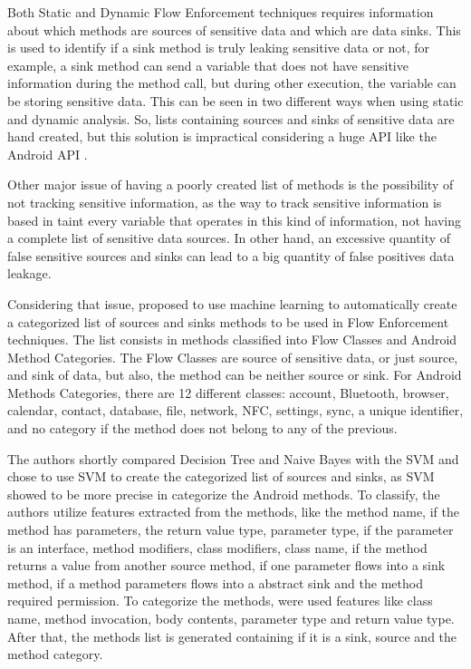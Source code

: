 Both Static and Dynamic Flow Enforcement techniques requires information about which methods are sources of sensitive data and which are data sinks. This is used to identify if a sink method is truly leaking sensitive data or not, for example, a sink method can send a variable that does not have sensitive information during the method call, but during other execution, the variable can be storing sensitive data. This can be seen in two different ways when using static and dynamic analysis. So, lists containing sources and sinks of sensitive data are hand created, but this solution is impractical considering a huge API like the Android API \citep{rasthofer2014machine}.

Other major issue of having a poorly created list of methods is the possibility of not tracking sensitive information, as the way to track sensitive information is based in taint every variable that operates in this kind of information, not having a complete list of sensitive data sources. In other hand, an excessive quantity of false sensitive sources and sinks can lead to a big quantity of false positives data leakage. 

Considering that issue, \cite{rasthofer2014machine} proposed to use machine learning to automatically create a categorized list of sources and sinks methods to be used in Flow Enforcement techniques. The list consists in methods classified into Flow Classes and Android Method Categories. The Flow Classes are source of sensitive data, or just source, and sink of data, but also, the method can be neither source or sink. For Android Methods Categories, there are 12 different classes: account, Bluetooth, browser, calendar, contact, database, file, network, NFC, settings, sync, a unique identifier, and no category if the method does not belong to any of the previous.

The authors shortly compared Decision Tree and Naive Bayes with the SVM and chose to use SVM to create the categorized list of sources and sinks, as SVM showed to be more precise in categorize the Android methods. To classify, the authors utilize features extracted from the methods, like the method name, if the method has parameters, the return value type, parameter type, if the parameter is an interface, method modifiers, class modifiers, class name, if the method returns a value from another source method, if one parameter flows into a sink method, if a method parameters flows into a abstract sink and the method required permission. To categorize the methods, were used features like class name, method invocation, body contents, parameter type and return value type. After that, the methods list is generated containing if it is a sink, source and the method category.


